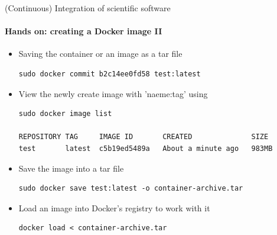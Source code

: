 \begin{frame}[fragile]{(Continuous) Integration of scientific software} 
    \framesubtitle{Hands on: creating a Docker image II} 
    \vfill

    \begin{itemize}
        \item Saving the container or an image as a tar file 

    \begin{verbatim}
sudo docker commit b2c14ee0fd58 test:latest
    \end{verbatim}

        \item View the newly create image with 'naeme:tag' using 

    \begin{verbatim}
sudo docker image list 

REPOSITORY TAG     IMAGE ID       CREATED              SIZE
test       latest  c5b19ed5489a   About a minute ago   983MB
    \end{verbatim}

    \item Save the image into a tar file 

    \begin{verbatim}
sudo docker save test:latest -o container-archive.tar
    \end{verbatim}

    \item Load an image into Docker's registry to work with it 

    \begin{verbatim}
docker load < container-archive.tar
    \end{verbatim}

\end{itemize}

\end{frame}

